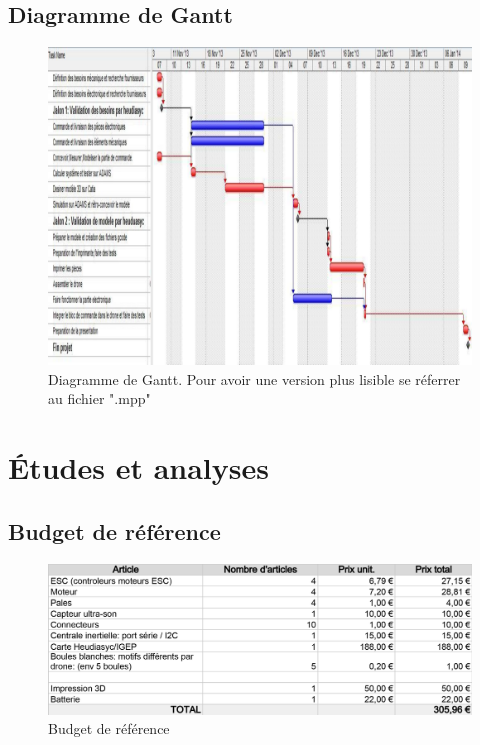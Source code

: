 \documentclass[a4paper, 12pt, leqno]{report}
\theoremstyle{plain}
\begin{document}
\begin{landscape}
           \section{Diagramme de Gantt}
           \begin{figure}[H]
           \begin{center}
           \includegraphics[scale=0.75]{Files/Gantt.pdf}
           \end{center}
           \caption{Diagramme de Gantt. Pour avoir une version plus lisible se réferrer au fichier ".mpp"}
           \label{Diagramme Gantt}
           \end{figure}
           \end{landscape}
           \chapter{Études et analyses}
           \section{Budget de référence}
           \begin{figure}[H]
           \begin{center}
           \includegraphics[scale=0.75]{Files/Budget_Achat_Composants.pdf}
           \end{center}
           \caption{Budget de référence}
           \label{Budget de référence}
           \end{figure}
\end{document}
